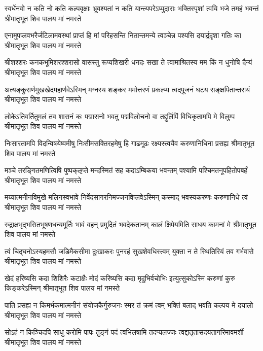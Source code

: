 \fourlineindentedshloka
{स्वर्धेनवो न कति नो कति कल्पवृक्षाः}
{भ्रूवश्यतां न कति यान्त्यपरेऽप्युदाराः}
{भक्तिस्पृशां त्वयि भजे तमहं भवन्तं}
{श्रीमातृभूत शिव पालय मां नमस्ते} %

\fourlineindentedshloka
{एनामुपप्लवभरैर्जटिलामवस्थां}
{प्राप्तं हि मां परिहसन्ति नितान्तमन्ये}
{त्वञ्चेन्न पश्यसि दयार्द्रदृशा गतिः का}
{श्रीमातृभूत शिव पालय मां नमस्ते} %

\fourlineindentedshloka
{श्रीशश्शरः कनकभूमिशरश्शरासो}
{वासस्तु रूप्यशिखरी धनदः सखा ते}
{त्वामाश्रितस्य मम किं न धुनोषि दैन्यं}
{श्रीमातृभूत शिव पालय मां नमस्ते} %

\fourlineindentedshloka
{अत्यङ्कुरार्णमुखखेदमहार्णवेऽस्मिन्}
{मग्नस्य शङ्कर ममोत्तरणं प्रकल्प्य}
{त्वद्पूजनं घटय सङ्क्षपितान्तरायं}
{श्रीमातृभूत शिव पालय मां नमस्ते} %

\fourlineindentedshloka
{लोकेऽतिवर्तितुमलं तव शासनं कः}
{पद्मासनो भवतु पद्मविलोचनो वा}
{तद्दुर्लिपिं विधिकृतामपि मे विलुम्प}
{श्रीमातृभूत शिव पालय मां नमस्ते} %

\fourlineindentedshloka
{निःसारतामपि विदन्विषयेष्वमीषु}
{निःसीमसक्तिरहमेषु हि गाढमूढः}
{रक्ष्यस्त्वयैव करुणानिधिना प्रसह्य}
{श्रीमातृभूत शिव पालय मां नमस्ते} %

\fourlineindentedshloka
{मञ्चे तरङ्गितमणित्विषि पुष्पक्ऌप्ते}
{मन्दस्मितं सह कदाऽम्बिकया भवन्तम्}
{पश्यामि पश्चिमतनूपहितोपबर्हं}
{श्रीमातृभूत शिव पालय मां नमस्ते} %

\fourlineindentedshloka
{मय्यात्मनीनविमुखे मलिनस्वभावे}
{निर्वेदसागरनिमज्जनविप्लवेऽस्मिन्}
{कस्माद् भवस्यकरुणः करुणानिधे त्वं}
{श्रीमातृभूत शिव पालय मां नमस्ते} %

\fourlineindentedshloka
{रुद्राक्षभृद्भसितभूषणधन्यमूर्तिः}
{भावं वहन् प्रमुदितं भवदेकतानम्}
{कालं क्षिपेयमिति साधय कामनां मे}
{श्रीमातृभूत शिव पालय मां नमस्ते} %

\fourlineindentedshloka
{त्वं चिद्घनोऽस्यहमसौ जडिमैकसीमा}
{दुःखाकरः पुनरहं सुखशेवधिस्त्वम्}
{युक्ता न ते स्थितिरियं तव गर्भवासे}
{श्रीमातृभूत शिव पालय मां नमस्ते} %

\fourlineindentedshloka
{खेदं हरिष्यसि कदा शिशिरैः कटाक्षैः}
{मोदं करिष्यसि कदा मृदुभिर्वचोभिः}
{ इत्युत्सुकोऽस्मि करुणां कुरु किङ्करेऽस्मिन्}
{श्रीमातृभूत शिव पालय मां नमस्ते} %

\fourlineindentedshloka
{पाति प्रसह्य न किमर्भकमात्मनीनं}
{संयोजकैर्गुरुजनः स्मर तं क्रमं त्वम्}
{भक्तिं बलाद् भवति कल्पय मे दयालो}
{श्रीमातृभूत शिव पालय मां नमस्ते} %

\fourlineindentedshloka
{सोऽहं न किञ्चिदपि साधु करोमि पापः}
{तुङ्गं पदं त्वभिलषामि तदप्यलज्जः}
{त्वद्दातृतासदयतागरिमावमर्शी}
{श्रीमातृभूत शिव पालय मां नमस्ते} %

